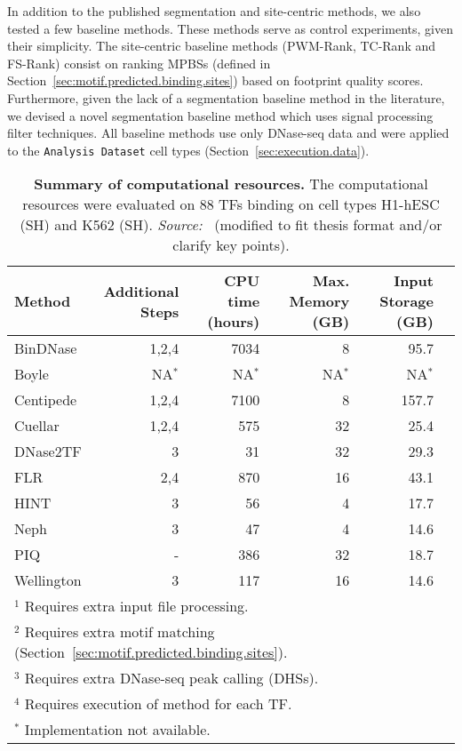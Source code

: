 In addition to the published segmentation and site-centric methods, we also tested a few baseline methods. These methods serve as control experiments, given their simplicity. The site-centric baseline methods (PWM-Rank, TC-Rank and FS-Rank) consist on ranking MPBSs (defined in Section~\ref{sec:motif.predicted.binding.sites}) based on footprint quality scores. Furthermore, given the lack of a segmentation baseline method in the literature, we devised a novel segmentation baseline method which uses signal processing filter techniques. All baseline methods use only DNase-seq data and were applied to the {\tt Analysis Dataset} cell types (Section~\ref{sec:execution.data}).

\begin{table}[h]
\begin{center}
\caption[Summary of computational resources]{\textbf{Summary of computational resources.} The computational resources were evaluated on $88$ TFs binding on cell types H1-hESC (SH) and K562 (SH). \emph{Source:~\cite{gusmao2016}} (modified to fit thesis format and/or clarify key points).} 
\label{tab:comp.resource}
\renewcommand{\arraystretch}{1.2}
\begin{tabularx}{\textwidth}{ lrrrrr }
\hline
Method & Additional Steps & CPU time (hours) & Max. Memory (GB) & Input Storage (GB) \\
\hline
BinDNase & 1,2,4 & 7034 & 8 & 95.7 \\
Boyle & NA$^*$ & NA$^*$ & NA$^*$ & NA$^*$ \\
Centipede & 1,2,4 & 7100 & 8 & 157.7 \\
Cuellar & 1,2,4 & 575 & 32 & 25.4 \\
DNase2TF & 3 & 31 & 32 & 29.3 \\
FLR & 2,4 & 870 & 16 & 43.1 \\
HINT & 3 & 56 & 4 & 17.7 \\
Neph & 3 & 47 & 4 & 14.6 \\
PIQ & - & 386 & 32 & 18.7 \\
Wellington & 3 & 117 & 16 & 14.6 \\
\hline
\multicolumn{6}{l}{$^1$ Requires extra input file processing.} \\
\multicolumn{6}{l}{$^2$ Requires extra motif matching (Section~\ref{sec:motif.predicted.binding.sites}).} \\
\multicolumn{6}{l}{$^3$ Requires extra DNase-seq peak calling (DHSs).} \\
\multicolumn{6}{l}{$^4$ Requires execution of method for each TF.} \\
\multicolumn{6}{l}{$^*$ Implementation not available.} \\
\end{tabularx}
\end{center}
\end{table}

